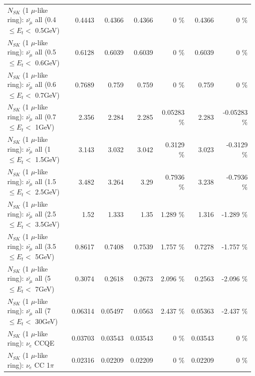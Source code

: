 \begin{table}
\begin{tabular}{| l | r | r | r  r | r  r |}
 $N_{SK}$ (1 $\mu$-like ring): $\bar{\nu_{\mu}}$ all (0.4 $\leq E_{t} <$ 0.5GeV) &          0.4443 &          0.4366 &          0.4366 &        0 \%  &          0.4366 &        0 \%  \\ 
 $N_{SK}$ (1 $\mu$-like ring): $\bar{\nu_{\mu}}$ all (0.5 $\leq E_{t} <$ 0.6GeV) &          0.6128 &          0.6039 &          0.6039 &        0 \%  &          0.6039 &        0 \%  \\ 
 $N_{SK}$ (1 $\mu$-like ring): $\bar{\nu_{\mu}}$ all (0.6 $\leq E_{t} <$ 0.7GeV) &          0.7689 &           0.759 &           0.759 &        0 \%  &           0.759 &        0 \%  \\ 
   $N_{SK}$ (1 $\mu$-like ring): $\bar{\nu_{\mu}}$ all (0.7 $\leq E_{t} <$ 1GeV) &           2.356 &           2.284 &           2.285 &  0.05283 \%  &           2.283 & -0.05283 \%  \\ 
   $N_{SK}$ (1 $\mu$-like ring): $\bar{\nu_{\mu}}$ all (1 $\leq E_{t} <$ 1.5GeV) &           3.143 &           3.032 &           3.042 &   0.3129 \%  &           3.023 &  -0.3129 \%  \\ 
 $N_{SK}$ (1 $\mu$-like ring): $\bar{\nu_{\mu}}$ all (1.5 $\leq E_{t} <$ 2.5GeV) &           3.482 &           3.264 &            3.29 &   0.7936 \%  &           3.238 &  -0.7936 \%  \\ 
 $N_{SK}$ (1 $\mu$-like ring): $\bar{\nu_{\mu}}$ all (2.5 $\leq E_{t} <$ 3.5GeV) &            1.52 &           1.333 &            1.35 &    1.289 \%  &           1.316 &   -1.289 \%  \\ 
   $N_{SK}$ (1 $\mu$-like ring): $\bar{\nu_{\mu}}$ all (3.5 $\leq E_{t} <$ 5GeV) &          0.8617 &          0.7408 &          0.7539 &    1.757 \%  &          0.7278 &   -1.757 \%  \\ 
     $N_{SK}$ (1 $\mu$-like ring): $\bar{\nu_{\mu}}$ all (5 $\leq E_{t} <$ 7GeV) &          0.3074 &          0.2618 &          0.2673 &    2.096 \%  &          0.2563 &   -2.096 \%  \\ 
    $N_{SK}$ (1 $\mu$-like ring): $\bar{\nu_{\mu}}$ all (7 $\leq E_{t} <$ 30GeV) &         0.06314 &         0.05497 &          0.0563 &    2.437 \%  &         0.05363 &   -2.437 \%  \\ 
\hline
\hline
\hline
                                      $N_{SK}$ (1 $\mu$-like ring): $\nu_e$ CCQE &         0.03703 &         0.03543 &         0.03543 &        0 \%  &         0.03543 &        0 \%  \\ 
                                 $N_{SK}$ (1 $\mu$-like ring): $\nu_e$ CC 1$\pi$ &         0.02316 &         0.02209 &         0.02209 &        0 \%  &         0.02209 &        0 \%  \\ 

\end{tabular}
\end{table}
